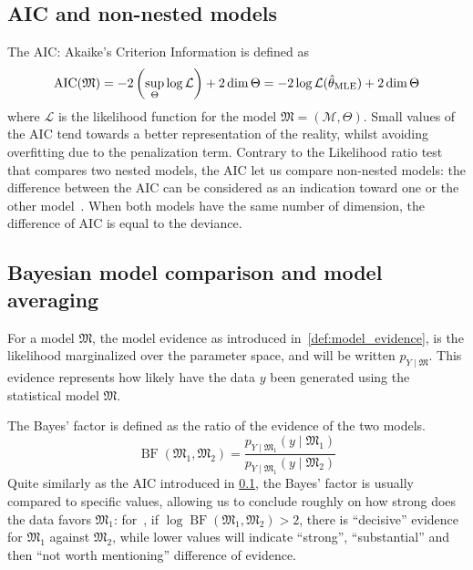 \documentclass[../../Main_ManuscritThese.tex]{subfiles}
\begin{document}
\subsection{AIC and non-nested models}
\label{sec:AIC_crit}
The AIC: Akaike's Criterion Information is defined as
\begin{equation}
  \mathop{\mathrm{AIC}}(\mathfrak{M}) = -2\left(\sup_{\Theta} \log \mathcal{L}\right) + 2 \mathop{\mathrm{dim}} \Theta = -2\log \mathcal{L}(\hat{\theta}_{\mathrm{MLE}}) + 2 \mathop{\mathrm{dim}} \Theta
\end{equation}
where $\mathcal{L}$ is the likelihood function for the model $\mathfrak{M} = (\mathcal{M},\Theta)$.
Small values of the AIC tend towards a better representation of the reality, whilst avoiding overfitting due to the penalization term.
Contrary to the Likelihood ratio test that compares two nested models, the AIC let us compare non-nested models: the difference between the AIC can be considered as an indication toward one or the other model~\cite{burnham_multimodel_2004}.
When both models have the same number of dimension, the difference of AIC is equal to the deviance.
\subsection{Bayesian model comparison and model averaging}
For a model $\mathfrak{M}$, the model evidence as introduced in~\cref{def:model_evidence}, is the likelihood marginalized over the parameter space, and will be written $p_{Y\mid \mathfrak{M}}$. This evidence represents how likely have the data $y$ been generated using the statistical model $\mathfrak{M}$.

The Bayes' factor is defined as the ratio of the evidence of the two models.
\begin{equation}
  \label{eq:bayes_factor}
  \mathop{\mathrm{BF}}(\mathfrak{M}_1,\mathfrak{M}_2)= \frac{p_{Y\mid \mathfrak{M}_1}(y \mid \mathfrak{M}_1) }{p_{Y\mid \mathfrak{M}_1}(y \mid \mathfrak{M}_2)}
\end{equation}
Quite similarly as the AIC introduced in \cref{sec:AIC_crit}, the Bayes' factor is usually compared to specific values, allowing us to conclude roughly on how strong does the data favors $\mathfrak{M}_1$: for~\cite{kass_bayes_1995}, if $\log\mathop{\mathrm{BF}}(\mathfrak{M}_1,\mathfrak{M}_2)>2$, there is ``decisive'' evidence for $\mathfrak{M}_1$ against $\mathfrak{M}_2$, while lower values will indicate ``strong'', ``substantial'' and then ``not worth mentioning'' difference of evidence.
\end{document}
